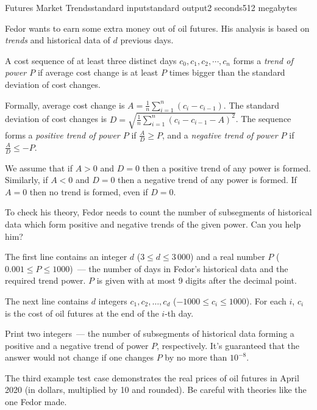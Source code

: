 \begin{problem}{Futures Market Trends}{standard input}{standard output}{2 seconds}{512 megabytes}

Fedor wants to earn some extra money out of oil futures. His analysis is based on \textit{trends} and historical data of $d$ previous days.

A cost sequence of at least three distinct days $c_0, c_1, c_2, \cdots, c_n$ forms a {\it trend of power $P$} if average cost change is at least $P$ times bigger than the standard deviation of cost changes.

Formally, average cost change is $A = \frac{1}{n}\sum\limits_{i=1}^n \left(c_i - c_{i-1}\right)$. The standard deviation of cost changes is $D = \sqrt{\frac{1}{n}\sum\limits_{i=1}^n{\left(c_i - c_{i-1} - A\right)^2}}$. The sequence forms a {\it positive trend of power $P$} if $\frac{A}{D} \ge P$, and a {\it negative trend of power $P$} if $\frac{A}{D} \le -P$. 

We assume that if $A > 0$ and $D = 0$ then a positive trend of any power is formed. Similarly, if $A < 0$ and $D = 0$ then a negative trend of any power is formed. If $A = 0$ then no trend is formed, even if $D = 0$.  

To check his theory, Fedor needs to count the number of subsegments of historical data which form positive and negative trends of the given power. Can you help him?



\InputFile
The first line contains an integer $d$ ($3 \le d \le 3\,000$) and a real number $P$ ($0.001 \le P \le 1000$)~--- the number of days in Fedor's historical data and the required trend power. $P$ is given with at most 9 digits after the decimal point.  

The next line contains $d$ integers $c_1, c_2, \ldots, c_d$ ($-1000 \le c_i \le 1000$). For each $i$, $c_i$ is the cost of oil futures at the end of the $i$-th day. 



\OutputFile
Print two integers~--- the number of subsegments of historical data forming a positive and a negative trend of power $P$, respectively. It's guaranteed that the answer would not change if one changes $P$ by no more than $10^{-8}$. 


\Examples

\setlength{\exmpwidinf}{0.6\thelinewidth}
\setlength{\exmpwidouf}{0.3\thelinewidth}
\begin{example}
%
%
%
\end{example}

\Note

The third example test case demonstrates the real prices of oil futures in April 2020 (in dollars, multiplied by 10 and rounded). Be careful with theories like the one Fedor made. 

\end{problem}

